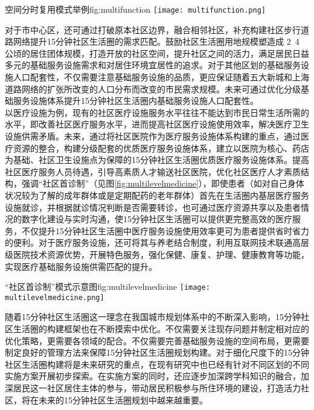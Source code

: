 \documentclass{shnuthesis}
\begin{document}
\begin{generalfig}[htb]{空间分时复用模式举例}{fig:multifunction}
	\vspace{1em}
	\texttt{[image: multifunction.png]}
\end{generalfig}

对于市中心区，还可通过打破原本社区边界，融合相邻社区，补充构建社区步行道路网络提升15分钟社区生活圈的需求匹配。鼓励社区生活圈用地规模塑造成 2~4 公顷的居住团体规模，打造开放的社区空间，提升社区之间的活力，满足居民日益多元的基础服务设施需求和对居住环境宜居性的追求\textsuperscript{\cite{liu2019}}。对于其他区划的基础服务设施人口配套性，不仅需要注意基础服务设施的品质，更应保证随着五大新城和上海道路网络的扩张所改变的人口分布而改变的市民需求规模。未来可通过优化分级基础服务设施体系提升15分钟社区生活圈内基础服务设施人口配套性。\\
\indent 以医疗设施为例，现有的社区医疗设施服务水平往往不能达到市民日常生活所需的水平，即改善社区医疗服务水平，进而提高社区医疗设施使用效率，解决医疗卫生设施供需矛盾。未来，通过将社区医院作为医疗服务设施体系构建的重点，通过医疗资源的整合，构建分级配套的优质医疗服务设施体系，建立以医院为核心、药店为基础、社区卫生设施点为保障的15分钟社区生活圈优质医疗服务设施体系。提高社区医疗服务人员待遇，引导高素质人才输送社区医院，优化社区医疗人才素质结构，强调“社区首诊制”（见图\ref{fig:multilevelmedicine}），即使患者（如对自己身体状况较为了解的成年群体或是定期配药的老年群体）首先在生活圈内基层医疗服务设施就诊，并根据就诊情况判断是否需要转诊，也可通过医疗资源共享以及患者情况的数字化建设与实时沟通，使15分钟社区生活圈可以提供更完整高效的医疗服务，不仅提升15分钟社区生活圈中医疗服务设施使用效率更可为患者提供省时省力的便利。对于医疗服务设施，还可将其与养老结合制度，利用互联网技术联通高层级医院技术资源优势，开展特色服务，强化保健、康复、护理、健康教育等功能，实现医疗基础服务设施供需匹配的提升\textsuperscript{\cite{ji2018}}。

\begin{generalfig}[htb]{“社区首诊制”模式示意图}{fig:multilevelmedicine}
	\vspace{1em}
	\texttt{[image: multilevelmedicine.png]}
\end{generalfig}

随着15分钟社区生活圈这一理念在我国城市规划体系中的不断深入影响，15分钟社区生活圈的构建框架也在不断摸索中优化。不仅需要关注现存问题并制定相对应的优化策略，更需要各领域的配合。不仅需要完善基础服务设施的空间布局，更需要制定良好的管理方法来保障15分钟社区生活圈规划构建。对于细化尺度下的15分钟社区生活圈构建将是未来研究的重点，在现有研究中也已经有针对不同区划的不同实施方案开展初步探索\textsuperscript{\cite{xu2019}}。在实施方案的同时，还应逐步加深跨学科知识的融合，加深居民这一社区居住主体的参与，带动居民积极参与所住环境的建设，打造活力社区，将在未来的15分钟社区生活圈规划中越来越重要。
\end{document}
